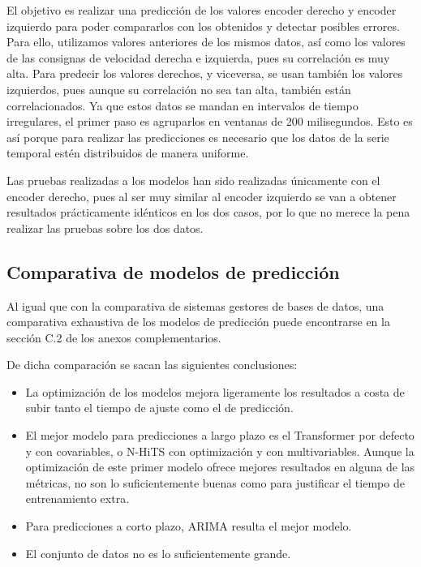 El objetivo es realizar una predicción de los valores encoder derecho y encoder izquierdo para poder 
compararlos con los obtenidos y detectar posibles errores. Para ello, utilizamos valores anteriores de los 
mismos datos, así como los valores de las consignas de velocidad derecha e izquierda, pues su correlación 
es muy alta. Para predecir los valores derechos, y viceversa, se usan también los valores izquierdos, pues aunque su 
correlación no sea tan alta, también están correlacionados.
Ya que estos datos se mandan en intervalos de tiempo irregulares, el primer paso es agruparlos en ventanas de 200 milisegundos. 
Esto es así porque para realizar las predicciones es necesario que los datos de la serie temporal estén distribuidos 
de manera uniforme.

Las pruebas realizadas a los modelos han sido realizadas únicamente con el encoder derecho, pues al ser muy similar 
al encoder izquierdo se van a obtener resultados prácticamente idénticos en los dos casos, por lo que no merece 
la pena realizar las pruebas sobre los dos datos.

\subsection{Comparativa de modelos de predicción}

Al igual que con la comparativa de sistemas gestores de bases de datos, una comparativa exhaustiva de los modelos 
de predicción puede encontrarse en la sección C.2 de los anexos complementarios.

De dicha comparación se sacan las siguientes conclusiones:
\begin{itemize}
    \item La optimización de los modelos mejora ligeramente los resultados a costa de subir tanto el tiempo de
        ajuste como el de predicción.
    \item El mejor modelo para predicciones a largo plazo es el Transformer por defecto y con covariables, o N-HiTS con 
        optimización y con multivariables. Aunque la optimización de este primer modelo ofrece mejores
        resultados en alguna de las métricas, no son lo suficientemente buenas como para justificar el tiempo de
        entrenamiento extra.
    \item Para predicciones a corto plazo, ARIMA resulta el mejor modelo.
    \item El conjunto de datos no es lo suficientemente grande.
\end{itemize}

